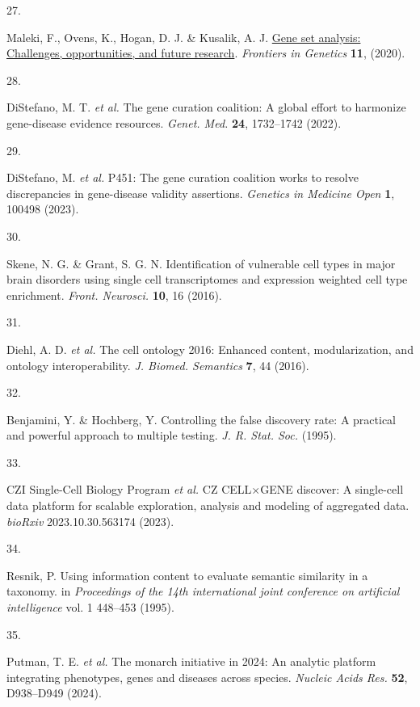 \documentclass[
]{article}
\newlength{\cslhangindent}
\newlength{\csllabelwidth}
\newenvironment{CSLReferences}[2] %
 {\begin{list}{}{%
  \setlength{\itemindent}{0pt}
  \setlength{\leftmargin}{0pt}
  \setlength{\parsep}{0pt}
  \ifodd #1
   \setlength{\leftmargin}{\cslhangindent}
   \setlength{\itemindent}{-1\cslhangindent}
  \fi
  \setlength{\itemsep}{#2\baselineskip}}}
 {\end{list}}
\newcommand{\CSLLeftMargin}[1]{\parbox[t]{\csllabelwidth}{\strut#1\strut}}
\newcommand{\CSLRightInline}[1]{\parbox[t]{\linewidth - \csllabelwidth}{\strut#1\strut}}
\begin{document}
\begin{CSLReferences}{0}{0}
\CSLLeftMargin{27. }%
\CSLRightInline{Maleki, F., Ovens, K., Hogan, D. J. \& Kusalik, A. J.
\href{https://doi.org/10.3389/fgene.2020.00654}{Gene set analysis:
Challenges, opportunities, and future research}. \emph{Frontiers in
Genetics} \textbf{11}, (2020).}

\CSLLeftMargin{28. }%
\CSLRightInline{DiStefano, M. T. \emph{et al.} The gene curation
coalition: A global effort to harmonize gene-disease evidence resources.
\emph{Genet. Med.} \textbf{24}, 1732--1742 (2022).}

\CSLLeftMargin{29. }%
\CSLRightInline{DiStefano, M. \emph{et al.} P451: The gene curation
coalition works to resolve discrepancies in gene-disease validity
assertions. \emph{Genetics in Medicine Open} \textbf{1}, 100498 (2023).}

\CSLLeftMargin{30. }%
\CSLRightInline{Skene, N. G. \& Grant, S. G. N. Identification of
vulnerable cell types in major brain disorders using single cell
transcriptomes and expression weighted cell type enrichment.
\emph{Front. Neurosci.} \textbf{10}, 16 (2016).}

\CSLLeftMargin{31. }%
\CSLRightInline{Diehl, A. D. \emph{et al.} The cell ontology 2016:
Enhanced content, modularization, and ontology interoperability.
\emph{J. Biomed. Semantics} \textbf{7}, 44 (2016).}

\CSLLeftMargin{32. }%
\CSLRightInline{Benjamini, Y. \& Hochberg, Y. Controlling the false
discovery rate: A practical and powerful approach to multiple testing.
\emph{J. R. Stat. Soc.} (1995).}

\CSLLeftMargin{33. }%
\CSLRightInline{CZI Single-Cell Biology Program \emph{et al.} {CZ}
{CELL\(\times\)GENE} discover: A single-cell data platform for scalable
exploration, analysis and modeling of aggregated data. \emph{bioRxiv}
2023.10.30.563174 (2023).}

\CSLLeftMargin{34. }%
\CSLRightInline{Resnik, P. Using information content to evaluate
semantic similarity in a taxonomy. in \emph{Proceedings of the 14th
international joint conference on artificial intelligence} vol. 1
448--453 (1995).}

\CSLLeftMargin{35. }%
\CSLRightInline{Putman, T. E. \emph{et al.} The monarch initiative in
2024: An analytic platform integrating phenotypes, genes and diseases
across species. \emph{Nucleic Acids Res.} \textbf{52}, D938--D949
(2024).}


\end{CSLReferences}
\end{document}
